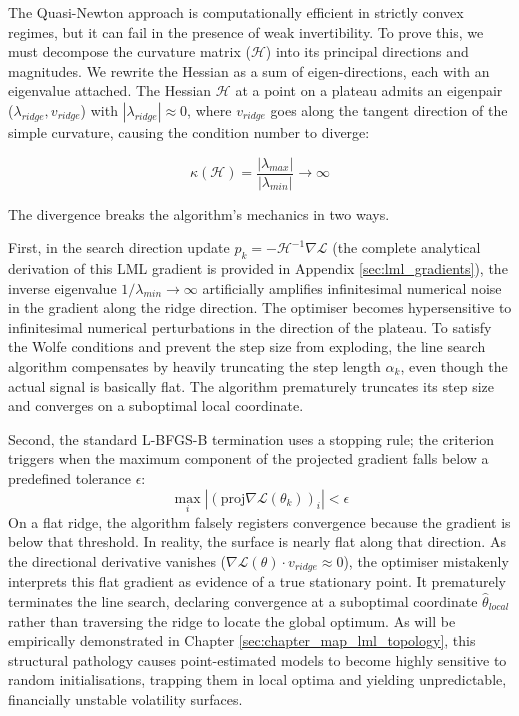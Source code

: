 \documentclass[12pt,oneside]{report}
\theoremstyle{definition}
\theoremstyle{remark}
\begin{document}
The Quasi-Newton approach is computationally efficient in strictly convex regimes, but it can fail in the presence of weak invertibility. To prove this, we must decompose the curvature matrix ($\mathcal{H}$) into its principal directions and magnitudes. We rewrite the Hessian as a sum of eigen-directions, each with an eigenvalue attached. The Hessian $\mathcal{H}$ at a point on a plateau admits an eigenpair ($\lambda_{ridge},v_{ridge}$) with $|\lambda_{ridge}| \approx 0$, where $v_{ridge}$ goes along the tangent direction of the simple curvature, causing the condition number to diverge:

$$\kappa(\mathcal{H}) = \frac{|\lambda_{max}|}{|\lambda_{min}|} \to \infty$$

The divergence breaks the algorithm's mechanics in two ways. 

First, in the search direction update $p_k = -\mathcal{H}^{-1} \nabla \mathcal{L}$ (the complete analytical derivation of this LML gradient is provided in Appendix \ref{sec:lml_gradients}), the inverse eigenvalue $1/\lambda_{min} \to \infty$ artificially amplifies infinitesimal numerical noise in the gradient along the ridge direction. The optimiser becomes hypersensitive to infinitesimal numerical perturbations in the direction of the plateau. To satisfy the Wolfe \cite{wolfe1969convergence, nocedal2006numerical} conditions and prevent the step size from exploding, the line search algorithm compensates by heavily truncating the step length $\alpha_k$, even though the actual signal is basically flat. The algorithm prematurely truncates its step size and converges on a suboptimal local coordinate.

Second, the standard L-BFGS-B termination uses a stopping rule; the criterion triggers when the maximum component of the projected gradient falls below a predefined tolerance $\epsilon$:$$\max_i |(\text{proj} \nabla \mathcal{L}(\theta_k))_i| < \epsilon$$ On a flat ridge, the algorithm falsely registers convergence because the gradient is below that threshold. In reality, the surface is nearly flat along that direction. As the directional derivative vanishes ($\nabla \mathcal{L}(\theta) \cdot v_{ridge} \approx 0$), the optimiser mistakenly interprets this flat gradient as evidence of a true stationary point. It prematurely terminates the line search, declaring convergence at a suboptimal coordinate $\hat{\theta}_{local}$ rather than traversing the ridge to locate the global optimum. As will be empirically demonstrated in Chapter \ref{sec:chapter_map_lml_topology}, this structural pathology causes point-estimated models to become highly sensitive to random initialisations, trapping them in local optima and yielding unpredictable, financially unstable volatility surfaces.
\end{document}
